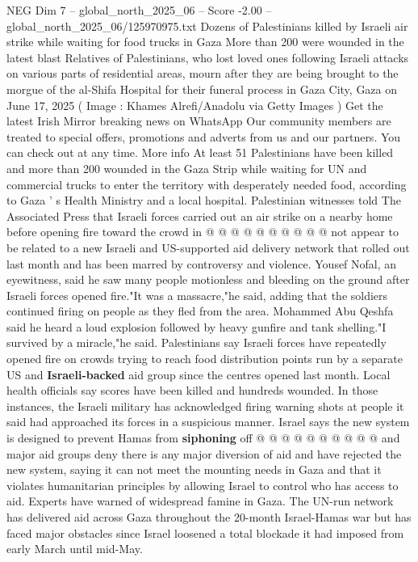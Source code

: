\begin{textsample}{NEG Dim 7 – global\_north\_2025\_06 – Score -2.00 – global\_north\_2025\_06/125970975.txt}  \label{ex:f7_neg_078}
Dozens of Palestinians killed by Israeli air strike while waiting for food trucks in Gaza More than 200 were wounded in the latest blast Relatives of Palestinians, who lost loved ones following Israeli attacks on various parts of residential areas, mourn after they are being brought to the morgue of the al-Shifa Hospital for their funeral process in Gaza City, Gaza on June 17, 2025 ( Image : Khames Alrefi/Anadolu via Getty Images ) Get the latest Irish Mirror breaking news on WhatsApp Our community members are treated to special offers, promotions and adverts from us and our partners.
You can check out at any time.
More info At least 51 Palestinians have been killed and more than 200 wounded in the Gaza Strip while waiting for UN and commercial trucks to enter the territory with desperately needed food, according to Gaza ' s Health Ministry and a local hospital.
Palestinian witnesses told The Associated Press that Israeli forces carried out an air strike on a nearby home before opening fire toward the crowd in @ @ @ @ @ @ @ @ @ @ not appear to be related to a new Israeli and US-supported aid delivery network that rolled out last month and has been marred by controversy and violence.
Yousef Nofal, an eyewitness, said he saw many people motionless and bleeding on the ground after Israeli forces opened fire."It was a massacre,"he said, adding that the soldiers continued firing on people as they fled from the area.
Mohammed Abu Qeshfa said he heard a loud explosion followed by heavy gunfire and tank shelling."I survived by a miracle,"he said.
Palestinians say Israeli forces have repeatedly opened fire on crowds trying to reach food distribution points run by a separate US and \textbf{Israeli-backed} aid group since the centres opened last month.
Local health officials say scores have been killed and hundreds wounded.
In those instances, the Israeli military has acknowledged firing warning shots at people it said had approached its forces in a suspicious manner.
Israel says the new system is designed to prevent Hamas from \textbf{siphoning} off @ @ @ @ @ @ @ @ @ @ and major aid groups deny there is any major diversion of aid and have rejected the new system, saying it can not meet the mounting needs in Gaza and that it violates humanitarian principles by allowing Israel to control who has access to aid.
Experts have warned of widespread famine in Gaza.
The UN-run network has delivered aid across Gaza throughout the 20-month Israel-Hamas war but has faced major obstacles since Israel loosened a total blockade it had imposed from early March until mid-May.

\end{textsample}
